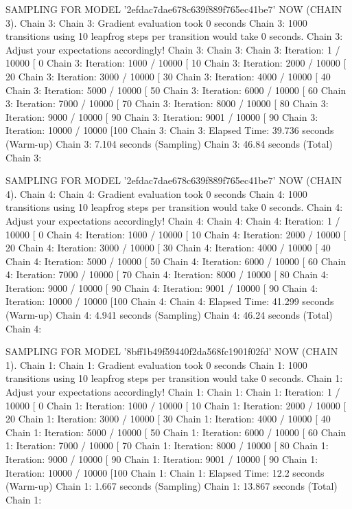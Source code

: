\documentclass[
]{jss}
\begin{document}
\begin{CodeChunk}
\begin{CodeOutput}
SAMPLING FOR MODEL '2efdac7dae678c639f889f765ec41be7' NOW (CHAIN 3).
Chain 3: 
Chain 3: Gradient evaluation took 0 seconds
Chain 3: 1000 transitions using 10 leapfrog steps per transition would take 0 seconds.
Chain 3: Adjust your expectations accordingly!
Chain 3: 
Chain 3: 
Chain 3: Iteration:    1 / 10000 [  0%
Chain 3: Iteration: 1000 / 10000 [ 10%
Chain 3: Iteration: 2000 / 10000 [ 20%
Chain 3: Iteration: 3000 / 10000 [ 30%
Chain 3: Iteration: 4000 / 10000 [ 40%
Chain 3: Iteration: 5000 / 10000 [ 50%
Chain 3: Iteration: 6000 / 10000 [ 60%
Chain 3: Iteration: 7000 / 10000 [ 70%
Chain 3: Iteration: 8000 / 10000 [ 80%
Chain 3: Iteration: 9000 / 10000 [ 90%
Chain 3: Iteration: 9001 / 10000 [ 90%
Chain 3: Iteration: 10000 / 10000 [100%
Chain 3: 
Chain 3:  Elapsed Time: 39.736 seconds (Warm-up)
Chain 3:                7.104 seconds (Sampling)
Chain 3:                46.84 seconds (Total)
Chain 3: 

SAMPLING FOR MODEL '2efdac7dae678c639f889f765ec41be7' NOW (CHAIN 4).
Chain 4: 
Chain 4: Gradient evaluation took 0 seconds
Chain 4: 1000 transitions using 10 leapfrog steps per transition would take 0 seconds.
Chain 4: Adjust your expectations accordingly!
Chain 4: 
Chain 4: 
Chain 4: Iteration:    1 / 10000 [  0%
Chain 4: Iteration: 1000 / 10000 [ 10%
Chain 4: Iteration: 2000 / 10000 [ 20%
Chain 4: Iteration: 3000 / 10000 [ 30%
Chain 4: Iteration: 4000 / 10000 [ 40%
Chain 4: Iteration: 5000 / 10000 [ 50%
Chain 4: Iteration: 6000 / 10000 [ 60%
Chain 4: Iteration: 7000 / 10000 [ 70%
Chain 4: Iteration: 8000 / 10000 [ 80%
Chain 4: Iteration: 9000 / 10000 [ 90%
Chain 4: Iteration: 9001 / 10000 [ 90%
Chain 4: Iteration: 10000 / 10000 [100%
Chain 4: 
Chain 4:  Elapsed Time: 41.299 seconds (Warm-up)
Chain 4:                4.941 seconds (Sampling)
Chain 4:                46.24 seconds (Total)
Chain 4: 

SAMPLING FOR MODEL '8bff1b49f59440f2da568fc1901f02fd' NOW (CHAIN 1).
Chain 1: 
Chain 1: Gradient evaluation took 0 seconds
Chain 1: 1000 transitions using 10 leapfrog steps per transition would take 0 seconds.
Chain 1: Adjust your expectations accordingly!
Chain 1: 
Chain 1: 
Chain 1: Iteration:    1 / 10000 [  0%
Chain 1: Iteration: 1000 / 10000 [ 10%
Chain 1: Iteration: 2000 / 10000 [ 20%
Chain 1: Iteration: 3000 / 10000 [ 30%
Chain 1: Iteration: 4000 / 10000 [ 40%
Chain 1: Iteration: 5000 / 10000 [ 50%
Chain 1: Iteration: 6000 / 10000 [ 60%
Chain 1: Iteration: 7000 / 10000 [ 70%
Chain 1: Iteration: 8000 / 10000 [ 80%
Chain 1: Iteration: 9000 / 10000 [ 90%
Chain 1: Iteration: 9001 / 10000 [ 90%
Chain 1: Iteration: 10000 / 10000 [100%
Chain 1: 
Chain 1:  Elapsed Time: 12.2 seconds (Warm-up)
Chain 1:                1.667 seconds (Sampling)
Chain 1:                13.867 seconds (Total)
Chain 1: 


\end{CodeOutput}
\end{CodeChunk}
\end{document}
